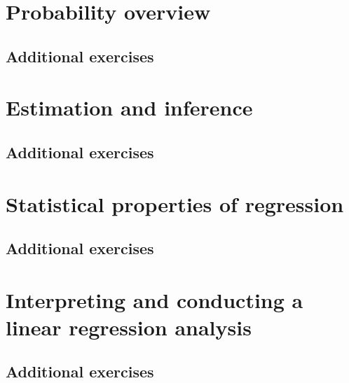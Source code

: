 \documentclass[12pt,notitlepage]{report}
\begin{document}
\part{Probability overview}




\chapter*{Additional exercises}


\part{Estimation and inference}






\newcommand*\FancyVerbStartString{## block}


\chapter*{Additional exercises}


\part{Statistical properties of regression}





\chapter*{Additional exercises}


\part{Interpreting and conducting a linear regression analysis}




\chapter*{Additional exercises}

\end{document}

